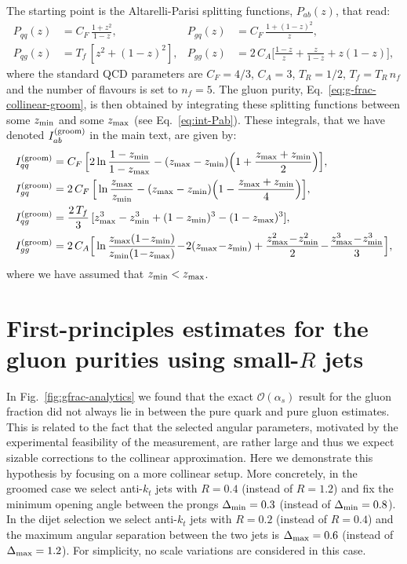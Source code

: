 \documentclass[a4paper,11pt]{article}
\newcommand{\zmin}{z_{\rm{min}}}
\newcommand{\zmax}{z_{\rm{max}}}
\begin{document}
The starting point is the Altarelli-Parisi splitting functions,
$P_{ab}(z)$, that read:
\begin{subequations}
\label{eq:ap}
\begin{align}
P_{qq}(z) & = C_F\,\frac{1+z^2}{1-z}, & P_{gq}(z) & = C_F\,\frac{1+(1-z)^2}{z},  \\
P_{qg}(z) & = T_f\,[z^2+(1-z)^2],     & P_{gg}(z) & = 2\,C_A\Big[\frac{1-z}{z} + \frac{z}{1-z} + z(1-z)\Big],
\end{align}
\end{subequations}
where the standard QCD parameters are $C_F=4/3$, $C_A=3$, $T_R=1/2$, $T_f=T_R\,n_f$ and the number of flavours is set to $n_f=5$.
The gluon purity, Eq.~\eqref{eq:g-frac-collinear-groom}, is then obtained by integrating these splitting functions between some $z_{\rm min}$ and some $z_{\rm max}$ (see Eq.~\eqref{eq:int-Pab}). These integrals, that we have denoted $I_{ab}^{\rm (groom)}$ in the main text, are given by:
\begin{subequations}
\label{eq:Iab}
\begin{align}
I^{(\rm groom)}_{qq} & = C_F\,\Big[2\ln\frac{1-\zmin}{1-\zmax}-(\zmax-\zmin)\Big(1+\frac{\zmax+\zmin}{2}\Big)\Big],  \\
I^{(\rm groom)}_{gq} & = 2\,C_F\, \Big[\ln\frac{\zmax}{\zmin}-(\zmax-\zmin)\Big(1-\frac{\zmax+\zmin}{4}\Big)\Big],  \\
I^{(\rm groom)}_{qg} & = \frac{2\,T_f}{3} \,[\zmax^3-\zmin^3+(1-\zmin)^3-(1-\zmax)^3],\\ 
I^{(\rm groom)}_{gg} & = 2\,C_A \Big[\ln\frac{\zmax(1\!-\!\zmin)}{\zmin(1\!-\!\zmax)}\!-\!2(\zmax\!-\!\zmin) + \frac{\zmax^2\!-\!\zmin^2}{2} \!-\! \frac{\zmax^3\!-\!\zmin^3}{3}\Big],
\end{align}
\end{subequations}
where we have assumed that $z_{\rm min}<z_{\rm max}$.
\section{First-principles estimates for the gluon purities using small-$R$ jets}
\label{app:small-R}
In Fig.~\ref{fig:gfrac-analytics} we found that the exact $\mathcal{O}(\alpha_s)$ result for the gluon fraction did not always lie in between the pure quark and pure gluon estimates. This is related to the fact that the selected angular parameters, motivated by the experimental feasibility of the measurement, are rather large and thus we expect sizable corrections to the collinear approximation. Here we demonstrate this hypothesis by focusing on a more collinear setup. More concretely, in the groomed case we select anti-$k_t$ jets with $R=0.4$ (instead of $R=1.2$) and fix the minimum opening angle between the prongs $\Delta_{\rm min}=0.3$ (instead of $\Delta_{\rm min}=0.8$). In the dijet selection we select anti-$k_t$ jets with $R=0.2$ (instead of $R=0.4$) and the maximum angular separation between the two jets is $\Delta_{\rm max}=0.6$ (instead of $\Delta_{\rm max}=1.2$). For simplicity, no scale variations are considered in this case. 
\end{document}

